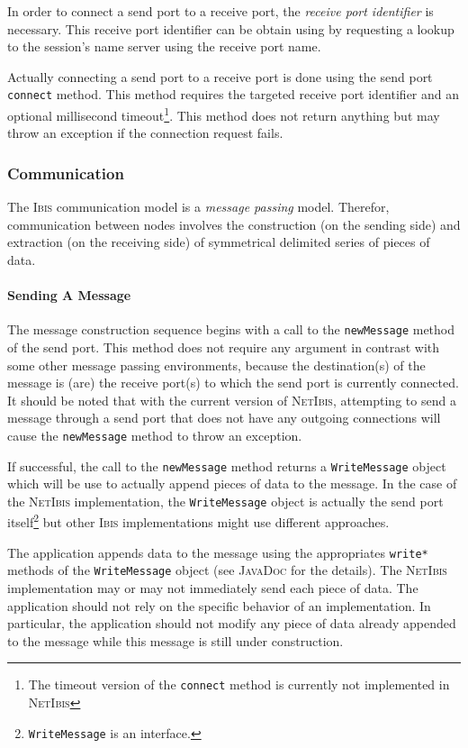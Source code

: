 \documentclass[11pt]{book}
\def\Ibis{\textsc{Ibis}\xspace}
\def\NetIbis{\textsc{NetIbis}\xspace}
\def\jd{\textsc{JavaDoc}\xspace}
\begin{document}
In order to connect a send port to a receive port, the \emph{receive
  port identifier} is necessary. This receive port identifier can be
obtain using by requesting a lookup to the session's name server using
the receive port name.

Actually connecting a send port to a receive port is done using the
send port \texttt{connect} method. This method requires the targeted
receive port identifier and an optional millisecond
timeout\footnote{The timeout version of the \texttt{connect} method is
  currently not implemented in \NetIbis}. This method does not return
anything but may throw an exception if the connection request fails.

%
\subsubsection{Communication}
\label{sec:communication-1}

The \Ibis communication model is a \emph{message passing} model.
Therefor, communication between nodes involves the construction (on
the sending side) and extraction (on the receiving side) of
symmetrical delimited series of pieces of data.

\paragraph{Sending A Message}
\label{sec:sending-message}

The message construction sequence begins with a call to the
\texttt{newMessage} method of the send port. This method does not require
any argument in contrast with some other message passing environments,
because the destination(s) of the message is (are) the receive port(s)
to which the send port is currently connected. It should be noted that
with the current version of \NetIbis, attempting to send a message
through a send port that does not have any outgoing connections will
cause the \texttt{newMessage} method to throw an exception.

If successful, the call to the \texttt{newMessage} method returns a
\texttt{WriteMessage} object which will be use to actually append
pieces of data to the message. In the case of the \NetIbis
implementation, the \texttt{WriteMessage} object is actually the send
port itself\footnote{\texttt{WriteMessage} is an interface.} but other
\Ibis implementations might use different approaches.

The application appends data to the message using the appropriates
\texttt{write*} methods of the \texttt{WriteMessage} object (see \jd
for the details). The \NetIbis implementation may or may not
immediately send each piece of data. The application should not rely
on the specific behavior of an implementation. In particular, the
application should not modify any piece of data already appended to
the message while this message is still under construction.
\end{document}
